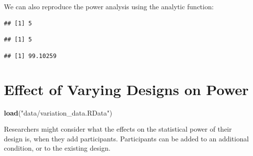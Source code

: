 \documentclass[]{book}
\newenvironment{Shaded}{\begin{snugshade}}{\end{snugshade}}
\newcommand{\KeywordTok}[1]{\textcolor[rgb]{0.13,0.29,0.53}{\textbf{#1}}}
\newcommand{\NormalTok}[1]{#1}
\newcommand{\OperatorTok}[1]{\textcolor[rgb]{0.81,0.36,0.00}{\textbf{#1}}}
\newcommand{\StringTok}[1]{\textcolor[rgb]{0.31,0.60,0.02}{#1}}
\begin{document}
We can also reproduce the power analysis using the analytic function:

\begin{Shaded}
\end{Shaded}

\begin{verbatim}
## [1] 5
\end{verbatim}

\begin{Shaded}
\end{Shaded}

\begin{verbatim}
## [1] 5
\end{verbatim}

\begin{Shaded}
\end{Shaded}

\begin{verbatim}
## [1] 99.10259
\end{verbatim}

\hypertarget{effect-of-varying-designs-on-power}{%
\chapter{Effect of Varying Designs on Power}\label{effect-of-varying-designs-on-power}}

\begin{Shaded}
\begin{Highlighting}[]
\KeywordTok{load}\NormalTok{(}\StringTok{"data/variation_data.RData"}\NormalTok{)}
\end{Highlighting}
\end{Shaded}

Researchers might consider what the effects on the statistical power of their design is, when they add participants. Participants can be added to an additional condition, or to the existing design.
\end{document}
